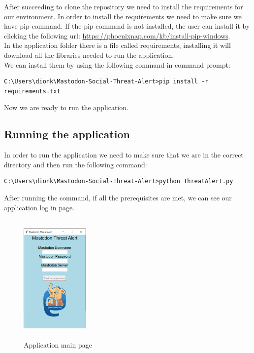 After succeeding to clone the repository we need to install the requirements for
our environment. In order to install the requirements we need to make sure we have
pip command. If the pip command is not installed, the user can install it by clicking
the following url: \url{https://phoenixnap.com/kb/install-pip-windows}.
\\[5pt]
In the application folder there is a file called requirements, installing it
will download all the libraries needed to run the application.
\\[5pt]
We can install them by using the following command in command prompt:
\\[5pt]
\begin{lstlisting}[caption=Installing requirements, captionpos=b]
	C:\Users\dionk\Mastodon-Social-Threat-Alert>pip install -r requirements.txt
\end{lstlisting}
Now we are ready to run the application.
\subsection{Running the application}
\label{ss:running_app}
In order to run the application we need to make sure that
we are in the correct directory and then run the following command:
\\[5pt]
\begin{lstlisting}[caption=Running the application, captionpos=b]
	C:\Users\dionk\Mastodon-Social-Threat-Alert>python ThreatAlert.py 
\end{lstlisting}

After running the command, if all the prerequisites are met, we can see 
our application log in page.
\begin{figure}[H]
	\centering
	\includegraphics[width=0.3\textwidth,height=240px]{images/mainpageapp.png}
	\caption{Application main page}
	\label{fig:empty_page}
\end{figure}

